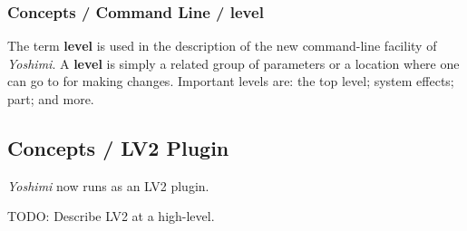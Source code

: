\subsubsection{Concepts / Command Line / level}
\label{subsubsec:concepts_command_line_level}

   The term \textbf{level} is used in the description of the new command-line
   facility of \textsl{Yoshimi}.
   A \textbf{level} is simply a related group of parameters or a location where
   one can go to for making changes.
   Important levels are:  the top level; system effects; part; and more.

\subsection{Concepts / LV2 Plugin}
\label{subsec:concepts_lv2_plugin}

   \textsl{Yoshimi} now runs as an LV2 plugin.

   TODO: Describe LV2 at a high-level.

